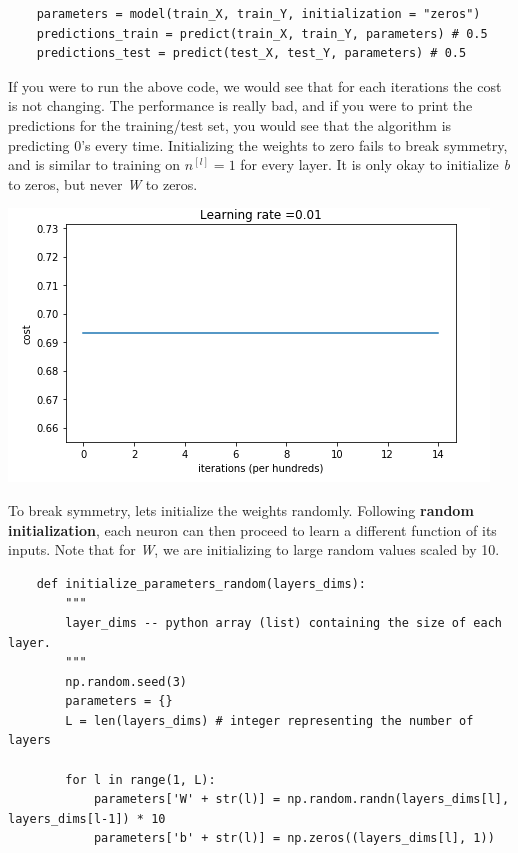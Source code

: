 \documentclass[11pt, a4paper]{article}
\begin{document}
\begin{spacing}{1.1}
\begin{lstlisting}
	parameters = model(train_X, train_Y, initialization = "zeros")
	predictions_train = predict(train_X, train_Y, parameters) # 0.5
	predictions_test = predict(test_X, test_Y, parameters) # 0.5 \end{lstlisting} \vspace*{1mm}
	\begin{minipage}[c]{10.5cm}
	If you were to run the above code, we would see that for each iterations the cost is not changing. The performance is really bad, and if you were to print the predictions for the training/test set, you would see that the algorithm is predicting 0's every time. Initializing the weights to zero fails to break symmetry, and is similar to training on $n^{[l]} = 1$ for every layer. It is only okay to initialize \textit{b} to zeros, but never \textit{W} to zeros.
	\end{minipage}
	\begin{minipage}[c]{8cm}
	\includegraphics[scale=0.55]{zeros_init} \\
	\end{minipage}
	To break symmetry, lets initialize the weights randomly. Following \textbf{random initialization}, each neuron can then proceed to learn a different function of its inputs. Note that for \textit{W}, we are initializing to large random values scaled by 10.
	\begin{lstlisting}
	def initialize_parameters_random(layers_dims):
		"""
		layer_dims -- python array (list) containing the size of each layer.
		"""
		np.random.seed(3)
		parameters = {}
		L = len(layers_dims) # integer representing the number of layers
		
		for l in range(1, L):
			parameters['W' + str(l)] = np.random.randn(layers_dims[l], layers_dims[l-1]) * 10
			parameters['b' + str(l)] = np.zeros((layers_dims[l], 1))
		

\end{lstlisting}
\end{spacing}
\end{document}
